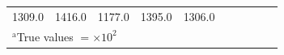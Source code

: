 \begin{table}[t]
\begin{center}
\begin{tabular}{llllllllll}
           1309.0
           

        
           &
           
           1416.0
           

        
           &
           
           1177.0
           

        
           &
           
           1395.0
           

        
           &
           
           1306.0
           

         \\


\multicolumn{10}{l}{$^{\mathrm{a}}$True values $ = \times 10^{2}$}
\end{tabular}
\end{center}
\label{T:popresults}
\end{table}

